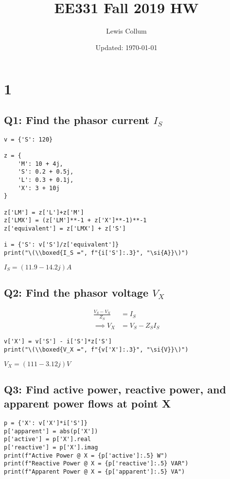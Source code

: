 \documentclass[11pt]{article}
\author{Lewis Collum}
\date{Updated: \today}
\title{EE331 Fall 2019 HW \jobname}
\begin{document}
\maketitle

\section*{1}
\label{sec:org8db3dda}
\subsection*{Q1: Find the phasor current \(I_S\)}
\label{sec:orgdbe0e8d}
\begin{verbatim}
v = {'S': 120}

z = {
    'M': 10 + 4j,
    'S': 0.2 + 0.5j,
    'L': 0.3 + 0.1j,
    'X': 3 + 10j
}

z['LM'] = z['L']+z['M']
z['LMX'] = (z['LM']**-1 + z['X']**-1)**-1
z['equivalent'] = z['LMX'] + z['S']

i = {'S': v['S']/z['equivalent']}
print("\(\\boxed{I_S =", f"{i['S']:.3}", "\si{A}}\)")
\end{verbatim}
\(\boxed{I_S = (11.9-14.2j) \si{A}}\)

\subsection*{Q2: Find the phasor voltage \(V_X\)}
\label{sec:org4df7a82}
\begin{align*}
  \frac{V_S-V_X}{Z_S} &= I_S \\
  \implies V_X &= V_S - Z_SI_S 
\end{align*}

\begin{verbatim}
v['X'] = v['S'] - i['S']*z['S']
print("\(\\boxed{V_X =", f"{v['X']:.3}", "\si{V}}\)")
\end{verbatim}
\(\boxed{V_X = (111-3.12j) \si{V}}\)

\subsection*{Q3: Find active power, reactive power, and apparent power flows at point X}
\label{sec:org5aa619d}
\begin{verbatim}
p = {'X': v['X']*i['S']}
p['apparent'] = abs(p['X'])
p['active'] = p['X'].real
p['reactive'] = p['X'].imag
print(f"Active Power @ X = {p['active']:.5} W")
print(f"Reactive Power @ X = {p['reactive']:.5} VAR")
print(f"Apparent Power @ X = {p['apparent']:.5} VA")
\end{verbatim}
\end{document}
